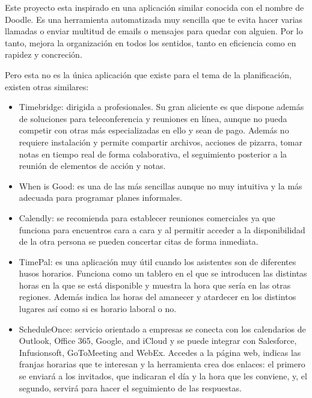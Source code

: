 \documentclass[a4paper, 12pt]{book}
\begin{document}
Este proyecto esta inspirado en una aplicaci\'on similar conocida con el nombre de Doodle. Es una herramienta automatizada muy sencilla que te evita hacer varias llamadas o enviar multitud de emails o mensajes para quedar con alguien. Por lo tanto, mejora la organizaci\'on en todos los sentidos, tanto en eficiencia como en rapidez y concreci\'on.

Pero esta no es la \'unica aplicaci\'on que existe para el tema de la planificaci\'on, existen otras similares:

\begin{itemize}
  \item Timebridge\cite{Timebridge}: dirigida a profesionales. Su gran aliciente es que dispone adem\'as de soluciones para teleconferencia y reuniones en l\'inea, aunque no pueda competir con otras m\'as especializadas en ello y sean de pago. Adem\'as no requiere instalaci\'on y permite compartir archivos, acciones de pizarra, tomar notas en tiempo real de forma colaborativa, el seguimiento posterior a la reuni\'on de elementos de acci\'on y notas.
 \item When is Good\cite{WhenIsGood}: es una de las m\'as sencillas aunque no muy intuitiva y la m\'as adecuada para programar planes informales.
 \item Calendly\cite{Calendly}: se recomienda para establecer reuniones comerciales ya que funciona para encuentros cara a cara y al permitir acceder a la disponibilidad de la otra persona se pueden concertar citas de forma inmediata. 
 \item TimePal\cite{TimePal}: es una aplicaci\'on muy \'util cuando los asistentes son de diferentes husos horarios. Funciona como un tablero en el que se introducen las distintas horas en la que se est\'a disponible y muestra la hora que ser\'ia en las otras regiones. Adem\'as indica las horas del amanecer y atardecer en los distintos lugares as\'i como si es horario laboral o no.
 \item ScheduleOnce\cite{ScheduleOnce}: servicio orientado a empresas se conecta con los calendarios de Outlook, Office 365, Google, and iCloud y se puede integrar con Salesforce, Infusionsoft, GoToMeeting and WebEx.  Accedes a la p\'agina web, indicas las franjas horarias que te interesan y la herramienta crea dos enlaces: el primero se enviar\'a a los invitados, que indicaran el d\'ia y la hora que les conviene, y, el segundo, servir\'a para hacer el seguimiento de las respuestas.
\end{itemize}
\end{document}
